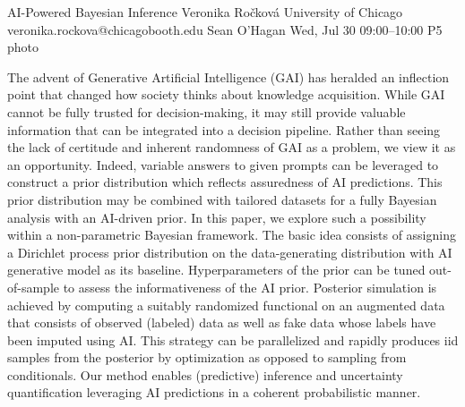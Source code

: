 \documentclass[12pt,lettersize,oneside]{book} %
\begin{document}
\clearpage
\begin{talk}
  {AI-Powered Bayesian Inference}%
  {Veronika Ro\v{c}kov\'a}%
  {University of Chicago}%
  {veronika.rockova@chicagobooth.edu}%
  {Sean O'Hagan}%
  {}%
  {Wed, Jul 30 09:00--10:00}%
  {P5}%
  {photo}%
  
    
   
The advent of Generative Artificial Intelligence (GAI) has heralded an inflection point that changed how society thinks about knowledge acquisition. While GAI cannot be fully trusted for decision-making, it may still provide valuable information that can be integrated into a decision pipeline. Rather than seeing the lack of certitude and inherent randomness of GAI as a problem, we view it as an opportunity. Indeed, variable answers to given prompts can be leveraged to construct a prior distribution which reflects assuredness of AI predictions. This prior distribution may be combined with tailored datasets for a fully Bayesian analysis with an AI-driven prior. In this paper, we explore such a possibility within a non-parametric Bayesian framework. The basic idea consists of assigning a Dirichlet process prior distribution on the data-generating distribution with AI generative model as its baseline. Hyperparameters of the prior can be tuned out-of-sample to assess the informativeness of the AI prior. Posterior simulation is achieved by computing a suitably randomized functional on an augmented data that consists of observed (labeled) data as well as fake data whose labels have been imputed using AI. This strategy can be parallelized and rapidly produces iid samples from the posterior by optimization as opposed to sampling from conditionals. Our method enables (predictive) inference and uncertainty quantification leveraging AI predictions in a coherent probabilistic manner.

\medskip

\end{talk}
\end{document}
